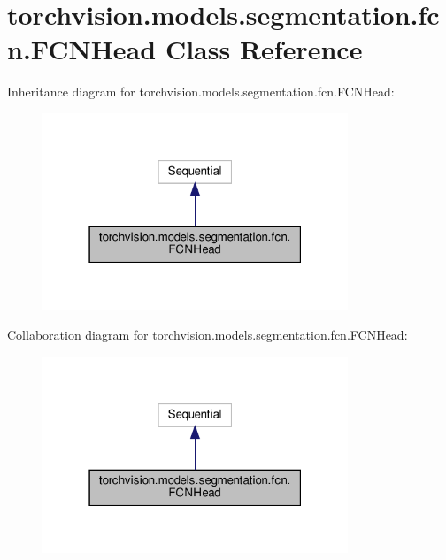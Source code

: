 \hypertarget{classtorchvision_1_1models_1_1segmentation_1_1fcn_1_1FCNHead}{}\section{torchvision.\+models.\+segmentation.\+fcn.\+F\+C\+N\+Head Class Reference}
\label{classtorchvision_1_1models_1_1segmentation_1_1fcn_1_1FCNHead}


Inheritance diagram for torchvision.\+models.\+segmentation.\+fcn.\+F\+C\+N\+Head\+:
\nopagebreak
\begin{figure}[H]
\begin{center}
\leavevmode
\includegraphics[width=259pt]{classtorchvision_1_1models_1_1segmentation_1_1fcn_1_1FCNHead__inherit__graph}
\end{center}
\end{figure}


Collaboration diagram for torchvision.\+models.\+segmentation.\+fcn.\+F\+C\+N\+Head\+:
\nopagebreak
\begin{figure}[H]
\begin{center}
\leavevmode
\includegraphics[width=259pt]{classtorchvision_1_1models_1_1segmentation_1_1fcn_1_1FCNHead__coll__graph}
\end{center}
\end{figure}
